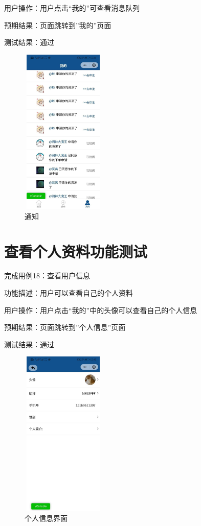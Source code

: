    用户操作：用户点击“我的”可查看消息队列
   
   预期结果：页面跳转到”我的”页面
   
   测试结果：通过

   \begin{figure}[htbp]
       \centering
       \begin{minipage}[t]{0.48\textwidth}
       \centering
       \includegraphics[width=4cm,height=8cm]{test/image/test51.png} 
    
      \caption{通知} 
       \end{minipage}
 
       \end{figure}
       \newpage 
   \section{查看个人资料功能测试}
   完成用例18：查看用户信息

   功能描述：用户可以查看自己的个人资料
   
   用户操作：用户点击“我的”中的头像可以查看自己的个人信息
   
   预期结果：页面跳转到”个人信息”页面
   
   测试结果：通过
   
   \begin{figure}[htbp]
       \centering
       \begin{minipage}[t]{0.48\textwidth}
       \centering
       \includegraphics[width=4cm,height=8cm]{test/image/test52.png}
       \caption{个人信息界面}
       \end{minipage}
       \end{figure}
      \newpage 
